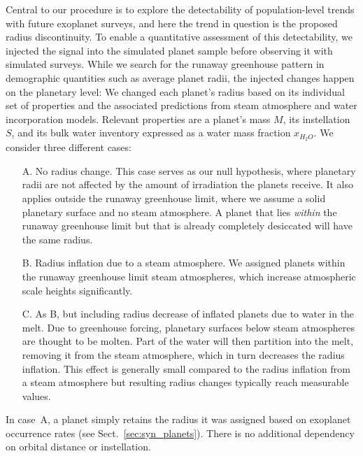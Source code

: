 \documentclass[twocolumn]{aastex631}
\begin{document}
    Central to our procedure is to explore the detectability of population-level trends with future exoplanet surveys, and here the trend in question is the proposed radius discontinuity.
    To enable a quantitative assessment of this detectability, we injected the signal into the simulated planet sample before observing it with simulated surveys.
    While we search for the runaway greenhouse pattern in demographic quantities such as average planet radii, the injected changes happen on the planetary level: We changed each planet's radius based on its individual set of properties and the associated predictions from steam atmosphere and water incorporation models.
    Relevant properties are a planet's mass $M$, its instellation $S$, and its bulk water inventory expressed as a water mass fraction $x_{H_2O}$.
    We consider three different cases:
    \begin{itemize}
   \item[A.] No radius change.
    This case serves as our null hypothesis, where planetary radii are not affected by the amount of irradiation the planets receive.
    It also applies outside the runaway greenhouse limit, where we assume a solid planetary surface and no steam atmosphere.
        A planet that lies \textit{within} the runaway greenhouse limit but that is already completely desiccated will have the same radius. 
   \item[B.] Radius inflation due to a steam atmosphere.
    We assigned planets within the runaway greenhouse limit steam atmospheres, which increase atmospheric scale heights significantly.
   \item[C.] As B, but including radius decrease of inflated planets due to water in the melt.
    Due to greenhouse forcing, planetary surfaces below steam atmospheres are thought to be molten.
    Part of the water will then partition into the melt, removing it from the steam atmosphere, which in turn decreases the radius inflation.
    This effect is generally small compared to the radius inflation from a steam atmosphere but resulting radius changes typically reach measurable values.
    \end{itemize}


In case~A, a planet simply retains the radius it was assigned based on exoplanet occurrence rates (see Sect.~\ref{sec:syn_planets}).
There is no additional dependency on orbital distance or instellation.
\end{document}
